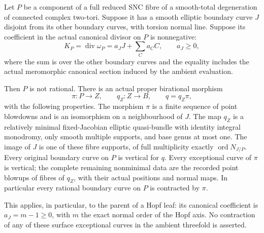 
\begin{proposition}\label{cdp:st:C.2.UN.70}
Let \(P\) be a component of a full reduced SNC fibre of
a smooth-total degeneration of connected complex two-tori.
Suppose it has a smooth elliptic boundary curve \(J\)
disjoint from its other boundary curves, with torsion
normal line. Suppose its coefficient in the actual
canonical divisor on \(P\) is nonnegative:
\[
 K_P=\operatorname{div}\omega_P
       =a_JJ+\sum_C a_C C,\qquad a_J\ge0 ,
 \tag{C.NP.1}\label{cdp:eq:C.NP.1}
\]
where the sum is over the other boundary curves and
the equality includes the actual meromorphic canonical
section induced by the ambient evaluation.

Then \(P\) is not rational. There is an actual proper
birational morphism
\[
 \pi:P\longrightarrow Z,\qquad q_Z:Z\longrightarrow B,
                    \qquad q=q_Z\pi ,
 \tag{C.NP.2}\label{cdp:eq:C.NP.2}
\]
with the following properties. The morphism \(\pi\)
is a finite sequence of point blowdowns and is an
isomorphism on a neighbourhood of \(J\). The map
\(q_Z\) is a relatively minimal fixed-Jacobian elliptic
quasi-bundle with identity integral monodromy, only
smooth multiple supports, and base genus at most one.
The image of \(J\) is one of these fibre supports,
of full multiplicity exactly
\(\operatorname{ord}N_{J/P}\).
Every original boundary curve on \(P\) is vertical
for \(q\). Every exceptional curve of \(\pi\) is
vertical; the complete remaining nonminimal data
are the recorded point blowups of fibres of \(q_Z\),
with their actual positions and normal maps.
In particular every rational boundary curve on
\(P\) is contracted by \(\pi\).

This applies, in particular, to the parent of a
Hopf leaf: its canonical coefficient is
\(a_J=m-1\ge0\), with \(m\) the exact normal
order of the Hopf axis. No contraction of any
of these surface exceptional curves in the
ambient threefold is asserted.
\end{proposition}

